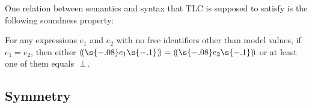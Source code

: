 \documentclass[fleqn,leqno]{article}
\newcommand{\tlc}[1]{\ensuremath{(\!(\s{-.08}#1\s{-.1})\!)}}
\def\bad{\ensuremath{\,\bot\,}}
\begin{document}
One relation between semantics and syntax that TLC is supposed to
satisfy is the following soundness property:
\begin{display}
For any expressions $e_{1}$ and $e_{2}$ with no free identifiers other
than model values, if $e_{1}=e_{2}$, then either
$\tlc{e_{1}}=\tlc{e_{2}}$ or at least one of them equals~\bad.
\end{display}
% 
%

% 




\subsection{Symmetry}
\end{document}
